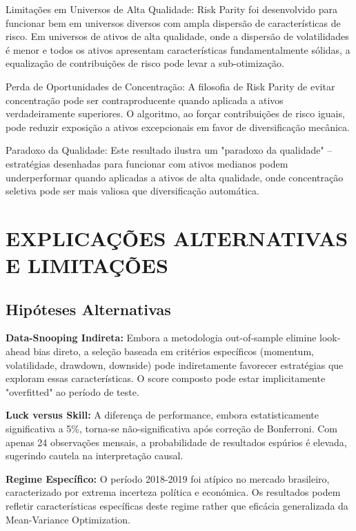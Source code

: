 Limitações em Universos de Alta Qualidade: Risk Parity foi desenvolvido para funcionar bem em universos diversos com ampla dispersão de características de risco. Em universos de ativos de alta qualidade, onde a dispersão de volatilidades é menor e todos os ativos apresentam características fundamentalmente sólidas, a equalização de contribuições de risco pode levar a sub-otimização.

Perda de Oportunidades de Concentração: A filosofia de Risk Parity de evitar concentração pode ser contraproducente quando aplicada a ativos verdadeiramente superiores. O algoritmo, ao forçar contribuições de risco iguais, pode reduzir exposição a ativos excepcionais em favor de diversificação mecânica.

Paradoxo da Qualidade: Este resultado ilustra um "paradoxo da qualidade" – estratégias desenhadas para funcionar com ativos medianos podem underperformar quando aplicadas a ativos de alta qualidade, onde concentração seletiva pode ser mais valiosa que diversificação automática.

\section{EXPLICAÇÕES ALTERNATIVAS E LIMITAÇÕES}

\subsection{Hipóteses Alternativas}

\textbf{Data-Snooping Indireta:} Embora a metodologia out-of-sample elimine look-ahead bias direto, a seleção baseada em critérios específicos (momentum, volatilidade, drawdown, downside) pode indiretamente favorecer estratégias que exploram essas características. O score composto pode estar implicitamente "overfitted" ao período de teste.

\textbf{Luck versus Skill:} A diferença de performance, embora estatisticamente significativa a 5\%, torna-se não-significativa após correção de Bonferroni. Com apenas 24 observações mensais, a probabilidade de resultados espúrios é elevada, sugerindo cautela na interpretação causal.

\textbf{Regime Específico:} O período 2018-2019 foi atípico no mercado brasileiro, caracterizado por extrema incerteza política e económica. Os resultados podem refletir características específicas deste regime rather que eficácia generalizada da Mean-Variance Optimization.

